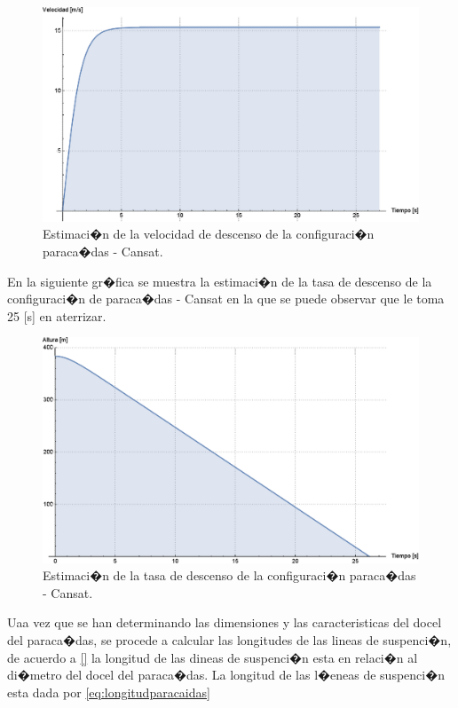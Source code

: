 \documentclass[10pt,a4paper]{book}
\begin{document}
\begin{figure}[H]
\begin{center}
\includegraphics[scale=0.70]{Imagenes/Paracaidasvelocidad.eps}
\caption{Estimaci�n de la velocidad de descenso de la configuraci�n paraca�das - Cansat.  \label{img:Paracaidasvelocidad}}
\end{center}
\end{figure}

En la siguiente gr�fica se muestra la estimaci�n de la tasa de descenso de la configuraci�n de paraca�das - Cansat en la que se puede observar que le toma 25 [s] en aterrizar.

\begin{figure}[H]
\begin{center}
\includegraphics[scale=0.70]{Imagenes/Paracaidasdistancia.eps}
\caption{Estimaci�n de la tasa de descenso de la configuraci�n paraca�das - Cansat.  \label{img:Paracaidasdistancia}}
\end{center}
\end{figure}
  
Uaa vez que se han determinando las dimensiones y las caracteristicas del docel del paraca�das, se procede a calcular las longitudes de las lineas de suspenci�n, de acuerdo a \ref{} la longitud de las dineas de suspenci�n esta en relaci�n al di�metro del docel del paraca�das. La longitud de las l�eneas de suspenci�n esta dada por \eqref{eq:longitudparacaidas}
\end{document}
